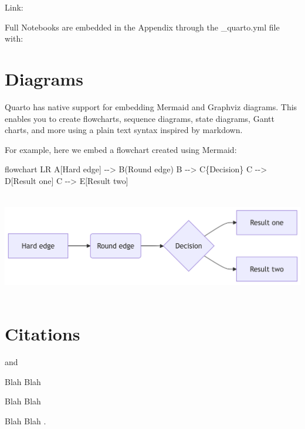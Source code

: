 \documentclass[
  11pt,
  letterpaper,
]{book}
\newenvironment{Shaded}{\begin{snugshade}}{\end{snugshade}}
\newcommand{\NormalTok}[1]{\textcolor[rgb]{0.00,0.23,0.31}{#1}}
\begin{document}
Link:

Full Notebooks are embedded in the Appendix through the \_quarto.yml
file with:

\section{Diagrams}\label{diagrams-1}

Quarto has native support for embedding Mermaid and Graphviz diagrams.
This enables you to create flowcharts, sequence diagrams, state
diagrams, Gantt charts, and more using a plain text syntax inspired by
markdown.

For example, here we embed a flowchart created using Mermaid:

\begin{Shaded}
\begin{Highlighting}[]
\NormalTok{flowchart LR}
\NormalTok{  A[Hard edge] {-}{-}\textgreater{} B(Round edge)}
\NormalTok{  B {-}{-}\textgreater{} C\{Decision\}}
\NormalTok{  C {-}{-}\textgreater{} D[Result one]}
\NormalTok{  C {-}{-}\textgreater{} E[Result two]}
\end{Highlighting}
\end{Shaded}

\includegraphics[width=6.88in,height=1.81in]{chapters/Outlines/Outline_11.7_0.5_files/figure-latex/mermaid-figure-1.png}

\section*{Citations}\label{sec-citations}


\textcite{soares2014}

\autocite{soares2014} and \autocite{knuth1984}

Blah Blah \autocites[see][33-35]{knuth1984}[also][chap.~1]{growiec2024}

Blah Blah \autocite[33-35, 38-39 and passim]{knuth1984}

Blah Blah \autocite{growiec2024,knuth1984}.
\end{document}
